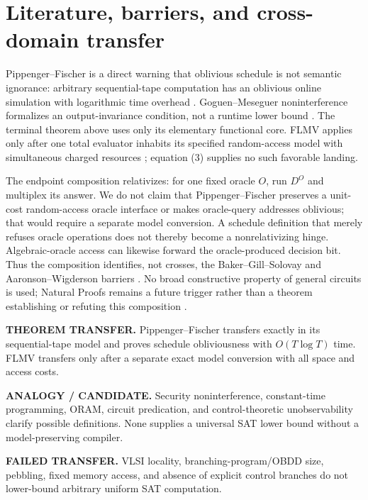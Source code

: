 \documentclass[11pt]{article}
\begin{document}
\section{Literature, barriers, and cross-domain transfer}

Pippenger--Fischer is a direct warning that oblivious schedule is not
semantic ignorance: arbitrary sequential-tape computation has an oblivious
online simulation with logarithmic time overhead \cite{pf}.  Goguen--Meseguer
noninterference formalizes an output-invariance condition, not a runtime lower
bound \cite{gm}.  The terminal theorem above uses only its elementary
functional core.  FLMV applies only after one total evaluator inhabits its
specified random-access model with simultaneous charged resources
\cite{flmv}; equation (3) supplies no such favorable landing.

The endpoint composition relativizes: for one fixed oracle $O$, run $D^O$
and multiplex its answer.  We do not claim that Pippenger--Fischer preserves
a unit-cost random-access oracle interface or makes oracle-query addresses
oblivious; that would require a separate model conversion.  A schedule
definition that merely refuses oracle operations does not thereby become a
nonrelativizing hinge.  Algebraic-oracle access can likewise forward the
oracle-produced decision bit.  Thus the composition identifies, not crosses,
the Baker--Gill--Solovay and Aaronson--Wigderson barriers \cite{bgs,aw}.  No
broad constructive property of general circuits is used;
Natural Proofs remains a future trigger rather than a theorem establishing or
refuting this composition \cite{rr}.

\begin{description}[leftmargin=0cm,labelwidth=0cm]
\item[] \textbf{THEOREM TRANSFER.}
Pippenger--Fischer transfers exactly in its sequential-tape model and proves
schedule obliviousness with $O(T\log T)$ time.  FLMV transfers only after a
separate exact model conversion with all space and access costs.
\item[] \textbf{ANALOGY / CANDIDATE.}
Security noninterference, constant-time programming, ORAM, circuit
predication, and control-theoretic unobservability clarify possible
definitions.  None supplies a universal SAT lower bound without a
model-preserving compiler.
\item[] \textbf{FAILED TRANSFER.}
VLSI locality, branching-program/OBDD size, pebbling, fixed memory access,
and absence of explicit control branches do not lower-bound arbitrary
uniform SAT computation.
\end{description}
\end{document}
